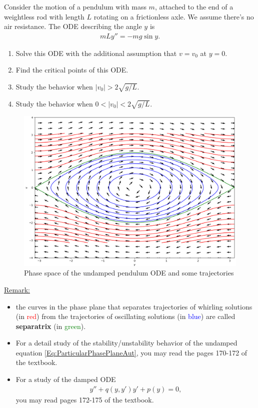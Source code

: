 \documentclass[12pt,a4paper]{article}
\newcounter{example}[section]
\begin{document}
\begin{example}
Consider the motion of a pendulum with mass $m$, attached to the end of a weightless rod with length $L$ rotating on a frictionless axle. We assume there's no air resistance. The ODE describing the angle $y$ is
	\begin{align*}
	mL y'' = -mg \sin y .
	\end{align*}
	\begin{enumerate}
	\item Solve this ODE with the additional assumption that $v = v_0$ at $y = 0$.
	\item Find the critical points of this ODE.
	\item Study the behavior when $|v_0| > 2 \sqrt{g/L}$.
	\item Study the behavior when $0 < |v_0| < 2 \sqrt{g/L}$.
	\end{enumerate}
\end{example}

\newpage

\phantom{2}

\newpage


\begin{figure}
\centering
\includegraphics[scale=0.575]{PhaseSpace-UndampedPendulum.png}
\caption{Phase space of the undamped pendulum ODE and some trajectories}\label{Fig:PhaseSpaceUndampedPendulum}
\end{figure}

\underline{Remark:}

	\begin{itemize}
	\item the curves in the phase plane that separates trajectories of whirling solutions (in \textcolor{red}{red}) from the trajectories of oscillating solutions (in \textcolor{blue}{blue}) are called \textbf{separatrix} (in \textcolor{green}{green}).
	\item For a detail study of the stability/unstability behavior of the undamped equation \eqref{Eq:ParticularPhasePlaneAut}, you may read the pages 170-172 of the textbook.
	\item For a study of the damped ODE
		\begin{align*}
		y'' + q (y, y') y' + p(y) = 0,
		\end{align*}
	you may read pages 172-175 of the textbook.
	\end{itemize}
\end{document}
